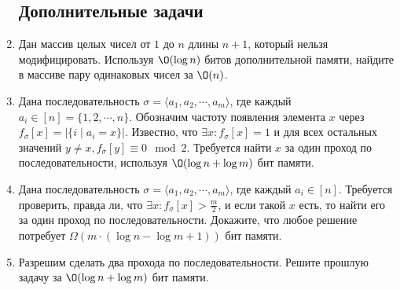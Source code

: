 \begin{enumerate}
  \subsection*{Дополнительные задачи}

  \item
  Дан массив целых чисел от $1$ до $n$ длины $n + 1$, который нельзя модифицировать. Используя $\O(\log{n})$ битов
  дополнительной памяти, найдите в массиве пару одинаковых чисел за $\O(n)$.

  \item Дана последовательность $\sigma = \langle a_1, a_2, \cdots, a_m\rangle$,
  где каждый $a_i \in [n] = \{1,2,\cdots,n\}$. Обозначим частоту
  появления элемента $x$ через $f_{\sigma}[x] = \left|\{i \mid a_i =
  x\}\right|$. Известно, что $\exists x: f_\sigma[x] = 1$ и для всех
  остальных значений $y \ne x, f_\sigma[y] \equiv 0 \mod
  2$. Требуется найти $x$ за один проход по последовательности,
  используя $\O(\log{n} + \log{m})$ бит памяти.

  \item Дана последовательность $\sigma = \langle a_1, a_2, \cdots, a_m \rangle$,
  где каждый $a_i \in [n]$. Требуется проверить, правда ли, что
  $\exists x: f_\sigma[x] > \frac{m}{2}$, и если такой $x$ есть, то
  найти его за один проход по последовательности.
  Докажите, что любое решение потребует $\Omega(m \cdot (\log{n} -
  \log{m} + 1))$ бит памяти.

  \item Разрешим сделать два прохода по последовательности. Решите
  прошлую задачу за $\O(\log{n} + \log{m})$ бит памяти.
\end{enumerate}

\pagebreak

